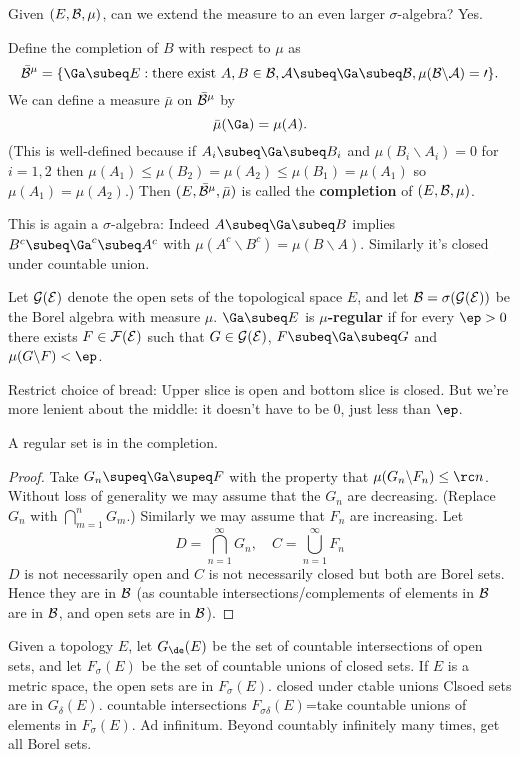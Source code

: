 Given $(E,\cal B, \mu)$, can we extend the measure to an even larger $\sigma$-algebra? Yes.
\begin{df}
Define the completion of $B$ with respect to $\mu$ as
\[\bar {\cal B}^{\mu}=\{\Ga\subeq E:\text{there exist }A,B\in \cal B, A\subeq \Ga\subeq B, \mu(B\backslash A)=0\}.\]
We can define a measure $\bar{\mu}$ on $\bar {\cal B}^{\mu}$ by \[\bar{\mu} (\Ga)=\mu(A).\]
(This is well-defined because if $A_i\subeq \Ga\subeq B_i$ and $\mu(B_i\backslash A_i)=0$ for $i=1,2$ then $\mu(A_1)\leq \mu(B_2)=\mu(A_2)\leq \mu(B_1)=\mu(A_1)$ so $\mu(A_1)=\mu(A_2)$.)
Then $(E,\bar{\cal  B}^{\mu}, \bar{\mu})$ is called the \textbf{completion} of $(E,\cal B,\mu)$.
\end{df}
This is again a $\sigma$-algebra: Indeed $A\subeq \Ga\subeq B$ implies $B^c\subeq \Ga^c\subeq A^c$ with $\mu(A^c\backslash B^c)=\mu(B\backslash A)$. Similarly it's closed under countable union.


\begin{df}
Let $\cal G(E)$ denote the open sets of the topological space $E$, and let $\cal B=\sigma(\cal G(E))$ be the Borel algebra with measure $\mu$. $\Ga\subeq E$ is $\mu$\textbf{-regular} if for every $\ep>0$ there exists $F\in \cal F(E)$ such that $G\in \cal G(E)$, $F\subeq \Ga\subeq G$ and $\mu(G\backslash F)<\ep$.
\end{df}
Restrict choice of bread: Upper slice is open and bottom slice is closed. But we're more lenient about the middle: it doesn't have to be 0, just less than $\ep$.

\begin{pr}
A regular set is in the completion.
\end{pr}
\begin{proof}
Take $G_n\supeq \Ga\supeq F$ with the property that $\mu(G_n\backslash F_n)\leq \rc n$. Without loss of generality we may assume that the $G_n$ are decreasing. (Replace $G_n$ with $\bigcap_{m=1}^nG_m$.) Similarly we may assume that $F_n$ are increasing. Let
\[D=\bigcap_{n=1}^{\infty} G_n,\quad C=\bigcup_{n=1}^{\infty} F_n\]
$D$ is not necessarily open and $C$ is not necessarily closed but both are Borel sets. %
Hence they are in $\cal B$ (as countable intersections/complements of elements in $\cal B$ are in $\cal B$, and open sets are in $\cal B$).
\end{proof}

Given a topology $E$, let $G_{\de}(E)$ be the set of countable intersections of open sets, and let $F_{\sigma}(E)$ be the set of countable unions of closed sets. If $E$ is a metric space, the open sets are in $F_{\sigma}(E)$. closed under ctable unions 
Clsoed sets are in $G_{\delta}(E)$.
countable intersections
$F_{\sigma\delta}(E)$=take countable unions of elements in $F_{\sigma}(E)$. Ad infinitum.
Beyond countably infinitely many times, get all Borel sets.
